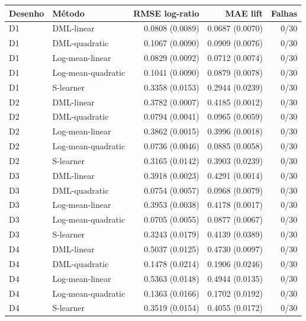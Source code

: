 \begin{tabular}{llrrr}
\toprule
Desenho & Método & RMSE log-ratio & MAE lift & Falhas \\
\midrule
D1 & DML-linear & 0.0808 (0.0089) & 0.0687 (0.0070) & 0/30 \\
D1 & DML-quadratic & 0.1067 (0.0090) & 0.0909 (0.0076) & 0/30 \\
D1 & Log-mean-linear & 0.0829 (0.0092) & 0.0712 (0.0074) & 0/30 \\
D1 & Log-mean-quadratic & 0.1041 (0.0090) & 0.0879 (0.0078) & 0/30 \\
D1 & S-learner & 0.3358 (0.0153) & 0.2944 (0.0239) & 0/30 \\
D2 & DML-linear & 0.3782 (0.0007) & 0.4185 (0.0012) & 0/30 \\
D2 & DML-quadratic & 0.0794 (0.0041) & 0.0965 (0.0059) & 0/30 \\
D2 & Log-mean-linear & 0.3862 (0.0015) & 0.3996 (0.0018) & 0/30 \\
D2 & Log-mean-quadratic & 0.0736 (0.0046) & 0.0885 (0.0058) & 0/30 \\
D2 & S-learner & 0.3165 (0.0142) & 0.3903 (0.0239) & 0/30 \\
D3 & DML-linear & 0.3918 (0.0023) & 0.4291 (0.0014) & 0/30 \\
D3 & DML-quadratic & 0.0754 (0.0057) & 0.0968 (0.0079) & 0/30 \\
D3 & Log-mean-linear & 0.3953 (0.0038) & 0.4178 (0.0017) & 0/30 \\
D3 & Log-mean-quadratic & 0.0705 (0.0055) & 0.0877 (0.0067) & 0/30 \\
D3 & S-learner & 0.3243 (0.0179) & 0.4139 (0.0389) & 0/30 \\
D4 & DML-linear & 0.5037 (0.0125) & 0.4730 (0.0097) & 0/30 \\
D4 & DML-quadratic & 0.1478 (0.0214) & 0.1906 (0.0246) & 0/30 \\
D4 & Log-mean-linear & 0.5363 (0.0148) & 0.4944 (0.0135) & 0/30 \\
D4 & Log-mean-quadratic & 0.1363 (0.0166) & 0.1702 (0.0192) & 0/30 \\
D4 & S-learner & 0.3519 (0.0154) & 0.4055 (0.0172) & 0/30 \\
\bottomrule
\end{tabular}
